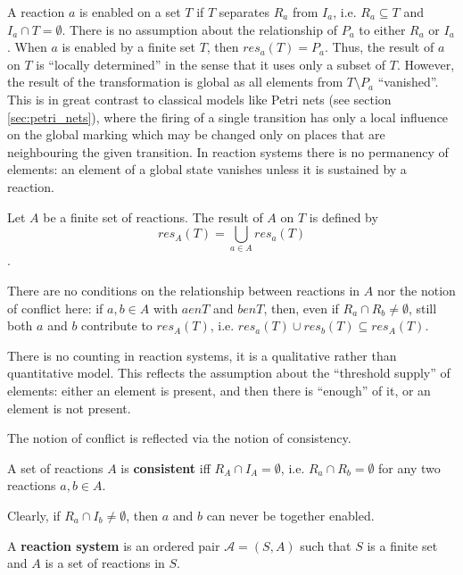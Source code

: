 
A reaction $a$ is enabled on a set $T$ if $T$ separates $R_a$ from $I_a$, i.e. $R_a\subseteq T$ and $I_a\cap T = \emptyset$. There is no assumption about the relationship of $P_a$ to either $R_a$ or $I_a$. When $a$ is enabled by a finite set $T$, then $res_a(T) = P_a$. Thus, the result of $a$ on $T$ is ``locally determined'' in the sense that it uses only a subset of $T$. However, the result of the transformation is global as all elements from $T \setminus P_a$ ``vanished''. This is in great contrast to classical models like Petri nets (see section \ref{sec:petri_nets}), where the firing of a single transition has only a local influence on the global marking which may be changed only on places that are neighbouring the given transition. In reaction systems there is no permanency of elements: an element of a global state vanishes unless it is sustained by a reaction.

\begin{definition}
  Let $A$ be a finite set of reactions. The result of $A$ on $T$ is defined by $$res_A(T) = \bigcup_{a\in A} res_a(T)$$.
\end{definition}

There are no conditions on the relationship between reactions in $A$ nor the notion of conflict here: if $a,b\in A$ with $a \mathrel{en} T$ and $b \mathrel{en} T$, then, even if $R_a\cap R_b\neq\emptyset$, still both $a$ and $b$ contribute to $res_A(T)$, i.e. $res_a(T)\cup res_b(T) \subseteq res_A(T)$.

There is no counting in reaction systems, it is a qualitative rather than quantitative model. This reflects the assumption about the ``threshold supply'' of elements: either an element is present, and then there is ``enough'' of it, or an element is not present.

The notion of conflict is reflected via the notion of consistency.

\begin{definition}
  A set of reactions $A$ is {\bf consistent} iff $R_A\cap I_A = \emptyset$, i.e. $R_a\cap R_b = \emptyset$ for any two reactions $a,b \in A$.
\end{definition}

Clearly, if $R_a\cap I_b\neq\emptyset$, then $a$ and $b$ can never be together enabled.

\begin{definition}
  A {\bf reaction system} is an ordered pair $\mathcal{A} = (S, A)$ such that $S$ is a finite set and $A$ is a set of reactions in $S$.
\end{definition}

